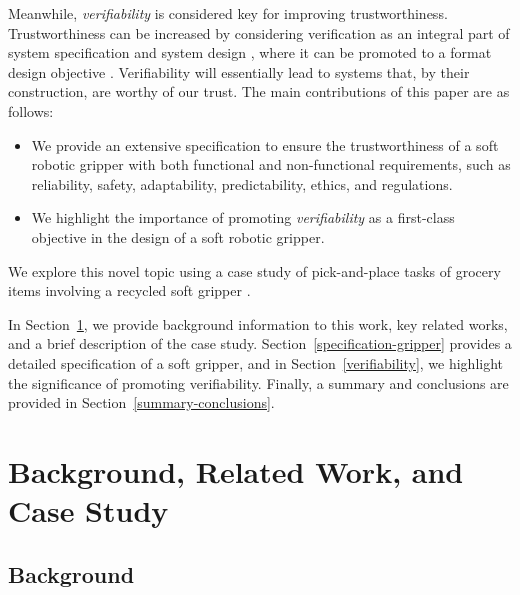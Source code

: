 \documentclass[lettersize,journal]{IEEEtran}
\begin{document}
Meanwhile, \emph{verifiability} is considered key for improving trustworthiness.  Trustworthiness can be increased  by considering verification as an integral part of system specification and system design \cite{Mousavi2022}, where it can be promoted to a format design objective \cite{Eder2021}. 
Verifiability will essentially lead to systems that, by their construction, are worthy of our trust. 
The main contributions of this paper are as follows:
\begin{itemize}
	\item We provide an extensive specification to ensure the trustworthiness of a soft robotic gripper \cite{Partridge2022} with both functional and non-functional requirements, such as reliability, safety, adaptability, predictability, ethics, and regulations.
	\item We highlight the importance of promoting \emph{verifiability} as a first-class objective in the design of a soft robotic gripper. 
\end{itemize}
We explore this novel topic using a case study of pick-and-place tasks of grocery items involving a recycled soft gripper \cite{Partridge2022}. 

In Section~\ref{background-relatedwork}, we provide background information to this work, key related works, and a brief description of the case study. %
Section~\ref{specification-gripper} provides a detailed specification of a soft gripper, and in Section~\ref{verifiability}, we highlight the significance of promoting verifiability.
Finally, a summary and conclusions are provided in Section~\ref{summary-conclusions}. 

\section{Background, Related Work, and Case Study}\label{background-relatedwork}

\subsection{Background}\label{background}
\end{document}
